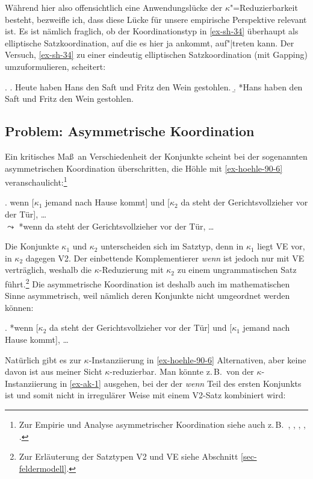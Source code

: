 Während hier also offensichtlich eine Anwendungslücke der $\kappa$"=Reduzierbarkeit besteht, bezweifle ich, dass diese Lücke für unsere empirische Perspektive relevant ist. Es ist nämlich fraglich, ob der Koordinationstyp in \ref{ex-sh-34} überhaupt als elliptische Satzkoordination, auf die es hier ja ankommt, auf"|treten kann. Der Versuch, \ref{ex-sh-34} zu einer eindeutig elliptischen Satzkoordination (mit Gapping) umzuformulieren, scheitert:

\ex. 
\a. Heute haben Hans den Saft und Fritz den Wein gestohlen.
\b. *Hans haben den Saft und Fritz den Wein gestohlen. 
%


\subsection{Problem: Asymmetrische Koordination}\label{sec:asymmetrische:koordination}
 
Ein kritisches Ma\ss\ an Verschiedenheit der Konjunkte scheint bei der sogenannten asymmetrischen Koordination \citep{Hoehle:90} überschritten, die Höhle mit \ref{ex-hoehle-90-6} veranschaulicht:\footnote{Zur Empirie und Analyse asymmetrischer Koordination siehe auch z.\,B.\  \cite{Wunderlich:88}, \cite{Buering:Hartmann:98}, \cite{Kathol:99}, \citet[596ff]{Sternefeld:06}, \cite{Reich:09}.} 

\ex. \label{ex-hoehle-90-6} wenn [$\kappa_1$ jemand nach Hause kommt] und [$\kappa_2$ da steht der Gerichtsvollzieher vor der Tür], \ldots \\
$\leadsto$ *wenn da steht der Gerichtsvollzieher vor der Tür, \ldots \\
\citep[(6)]{Hoehle:90}

Die Konjunkte $\kappa_1$ und $\kappa_2$ unterscheiden sich im Satztyp, denn in $\kappa_1$ liegt VE vor, in $\kappa_2$ dagegen V2. Der einbettende Komplementierer {\it wenn} ist jedoch nur mit VE verträglich, weshalb die $\kappa$-Reduzierung mit $\kappa_2$ zu einem ungrammatischen Satz führt.\footnote{Zur Erläuterung der Satztypen V2 und VE siehe Abschnitt \ref{sec-feldermodell}.} Die asymmetrische Koordination ist deshalb auch im mathematischen Sinne asymmetrisch, weil nämlich deren Konjunkte nicht umgeordnet werden können:

\ex. *wenn [$\kappa_2$ da steht der Gerichtsvollzieher vor der Tür] und [$\kappa_1$ jemand nach Hause kommt], \ldots

Natürlich gibt es zur $\kappa$-Instanziierung in \ref{ex-hoehle-90-6} Alternativen, aber keine davon ist aus meiner Sicht $\kappa$-reduzierbar. Man könnte z.\,B.\  von der $\kappa$-Instanziierung in \ref{ex-ak-1} ausgehen, bei der der  {\it wenn} Teil des ersten Konjunkts ist und somit nicht in irregulärer Weise mit einem V2-Satz kombiniert wird:

